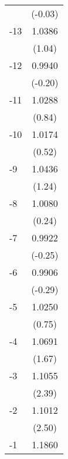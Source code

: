 {\begin{tabular}{l*{1}{c}}
                                   &     (-0.03)         \\
[1em]
  -13                              &      1.0386         \\
                                   &      (1.04)         \\
[1em]
  -12                              &      0.9940         \\
                                   &     (-0.20)         \\
[1em]
  -11                              &      1.0288         \\
                                   &      (0.84)         \\
[1em]
  -10                              &      1.0174         \\
                                   &      (0.52)         \\
[1em]
   -9                              &      1.0436         \\
                                   &      (1.24)         \\
[1em]
   -8                              &      1.0080         \\
                                   &      (0.24)         \\
[1em]
   -7                              &      0.9922         \\
                                   &     (-0.25)         \\
[1em]
   -6                              &      0.9906         \\
                                   &     (-0.29)         \\
[1em]
   -5                              &      1.0250         \\
                                   &      (0.75)         \\
[1em]
   -4                              &      1.0691\sym{*}  \\
                                   &      (1.67)         \\
[1em]
   -3                              &      1.1055\sym{**} \\
                                   &      (2.39)         \\
[1em]
   -2                              &      1.1012\sym{**} \\
                                   &      (2.50)         \\
[1em]
   -1                              &      1.1860\sym{***}\\

\end{tabular}}
